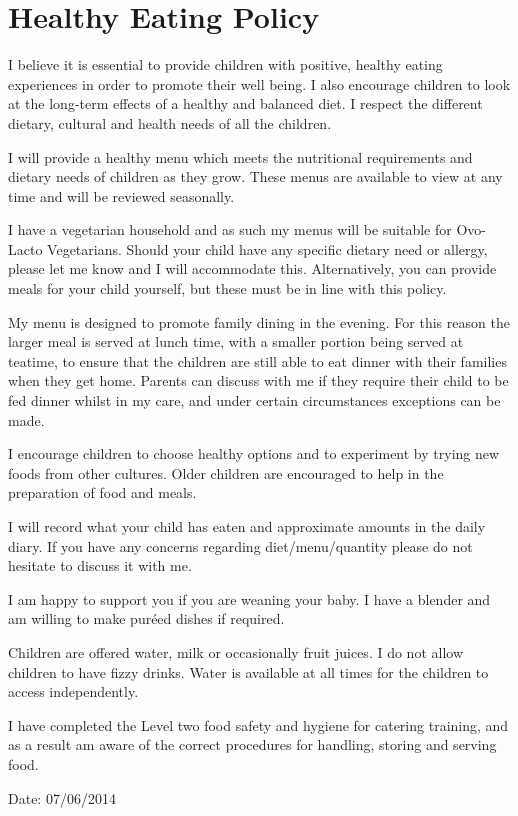\documentclass[10pt]{article}
\begin{document}
\section{Healthy Eating Policy}

I believe it is essential to provide children with positive, healthy
eating experiences in order to promote their well being. I also
encourage children to look at the long-term effects of a healthy and
balanced diet. I respect the different dietary, cultural and health
needs of all the children.

I will provide a healthy menu which meets the nutritional requirements
and dietary needs of children as they grow. These menus are available to
view at any time and will be reviewed seasonally.

I have a vegetarian household and as such my menus will be suitable for
Ovo-Lacto Vegetarians. Should your child have any specific dietary need
or allergy, please let me know and I will accommodate this.
Alternatively, you can provide meals for your child yourself, but these
must be in line with this policy.

My menu is designed to promote family dining in the evening. For this
reason the larger meal is served at lunch time, with a smaller portion
being served at teatime, to ensure that the children are still able to
eat dinner with their families when they get home. Parents can discuss
with me if they require their child to be fed dinner whilst in my care,
and under certain circumstances exceptions can be made.

I encourage children to choose healthy options and to experiment by
trying new foods from other cultures. Older children are encouraged to
help in the preparation of food and meals.

I will record what your child has eaten and approximate amounts in the
daily diary. If you have any concerns regarding diet/menu/quantity
please do not hesitate to discuss it with me.

I am happy to support you if you are weaning your baby. I have a blender
and am willing to make puréed dishes if required.

Children are offered water, milk or occasionally fruit juices. I do not
allow children to have fizzy drinks. Water is available at all times for
the children to access independently.

I have completed the Level two food safety and hygiene for catering
training, and as a result am aware of the correct procedures for
handling, storing and serving food.

Date: 07/06/2014

~
\end{document}
